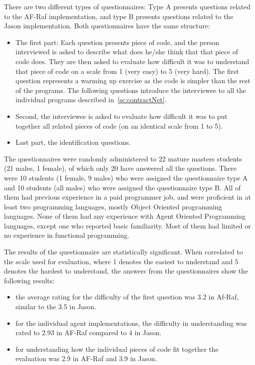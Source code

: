 \documentclass[a4paper,12pt,oneside,fleqn]{book} %
\begin{document}
There are two different types of questionnaires: Type A presents questions
related to the AF-Raf implementation, and type B presents questions related
to the Jason implementation. Both questionnaires have the same structure:

\begin{itemize}
    \item The first part: Each question presents piece of code, and the
      person interviewed is asked to describe what does he/she think that
      that piece of code does. They are then  asked to evaluate how
      difficult it was to understand that piece of code on a scale from 1
      (very easy) to 5 (very hard). The first question represents a warming
      up exercise as the code is simpler than the rest of the programs. The
      following questions introduce the interviewee to all the individual
      programs described in~\autoref{sc:contractNet}.

    \item Second, the interviewee is asked to evaluate how difficult
      it was to put together all related pieces of code (on an identical
      scale from 1 to 5).

    \item Last part, the identification questions.

\end{itemize}

The questionnaires were randomly administered to 22 mature masters
students (21 males, 1 female), of which only 20 have answered all the
questions. There were 10 students (1 female, 9 males) who were assigned the
questionnaire type A and 10 students (all males) who were assigned
the questionnaire type B. All of them had previous experience in a paid
programmer job, and were proficient in at least two programming languages,
mostly Object Oriented programming languages. None of them had any
experience with Agent Oriented Programming languages, except one who
reported basic familiarity. Most of them had limited or no experience in
functional programming.

The results of the questionnaire are statistically significant. When
correlated to the scale used for evaluation, where 1 denotes the easiest to
understand and 5 denotes the hardest to understand, the answers from the
questionnaires show the following results:

\begin{itemize}
    \item the average rating for the difficulty of the first question was
      3.2 in Af-Raf, similar to the 3.5 in Jason. 
    \item for the individual agent implementations, the difficulty in
      understanding was rated to 2.93 in AF-Raf compared to 4 in Jason.
    \item for understanding how the individual pieces of code fit
      together the evaluation was 2.9 in AF-Raf and 3.9 in Jason.
\end{itemize}
\end{document}
